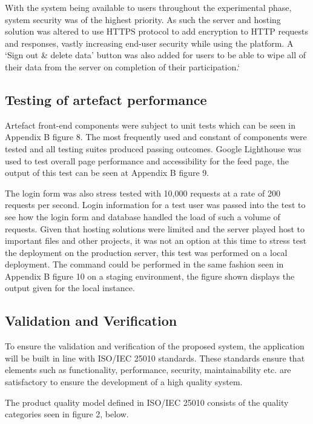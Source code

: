 \documentclass[lettersize,journal]{IEEEtran}
\begin{document}
	With the system being available to users throughout the experimental phase, system security was of the highest priority. As such the server and hosting solution was altered to use HTTPS protocol
	 to add encryption to HTTP requests and responses, vastly increasing end-user security while using the platform. 
	 A `Sign out \& delete data' button was also added for users to be able to wipe all of their data from the server on completion of their participation.`
       
       \subsection{Testing of artefact performance}
      Artefact front-end components were subject to unit tests which can be seen in Appendix B figure 8. The most frequently used and constant of components were tested and all testing suites produced
      passing outcomes. Google Lighthouse was used to test overall page performance and accessibility for the feed page, the output of this test can be seen at Appendix B figure 9.

      The login form was also stress tested with 10,000 requests at a rate of 200 requests per second. Login information for a test user was passed into the test to see how the login form and 
      database handled the load of such a volume of requests. Given that hosting solutions were limited and the server played host to important files and other projects, it was not an option at
      this time to stress test the deployment on the production server, this test was performed on a local deployment. The command could be performed in the same fashion seen in
      Appendix B figure 10 on a staging environment, the figure shown displays the output given for the local instance.

        \subsection{Validation and Verification}

        To ensure the validation and verification of the proposed system, the application will be built in line with ISO/IEC 25010 \cite{ISO25000} standards.
        These standards ensure that elements such as functionality, performance, security, maintainability etc. are satisfactory to ensure the development of a high quality system.

        The product quality model defined in ISO/IEC 25010 consists of the quality categories seen in figure 2, below.
\end{document}
